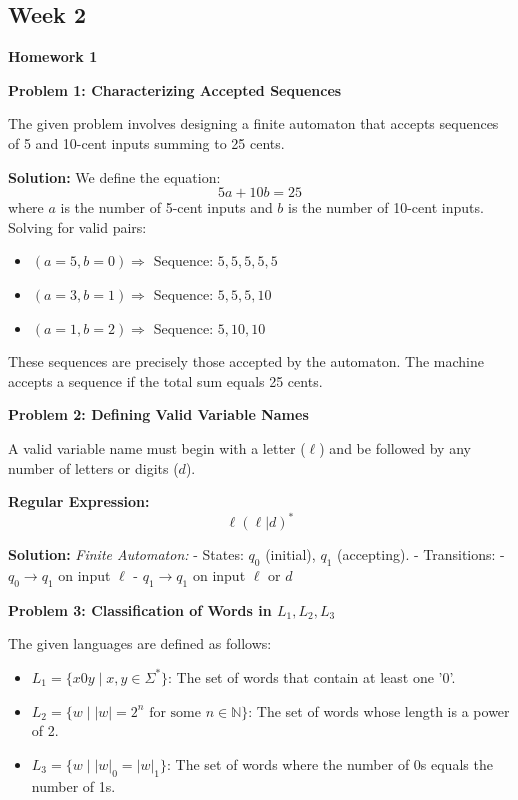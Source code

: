 \documentclass{article}
\theoremstyle{theorem}
\theoremstyle{definition}
\theoremstyle{remark}
\begin{document}
\subsection{Week 2}
{\textbf{{Homework 1}}}

\textbf{Problem 1: Characterizing Accepted Sequences}

The given problem involves designing a finite automaton that accepts sequences of 5 and 10-cent inputs summing to 25 cents.

\textbf{Solution:}
We define the equation:
\begin{equation}
5a + 10b = 25
\end{equation}
where $a$ is the number of 5-cent inputs and $b$ is the number of 10-cent inputs. Solving for valid pairs:
\begin{itemize}
    \item $(a=5, b=0) \Rightarrow$ Sequence: $5,5,5,5,5$
    \item $(a=3, b=1) \Rightarrow$ Sequence: $5,5,5,10$
    \item $(a=1, b=2) \Rightarrow$ Sequence: $5,10,10$
\end{itemize}
These sequences are precisely those accepted by the automaton. The machine accepts a sequence if the total sum equals 25 cents.\newline

\textbf{Problem 2: Defining Valid Variable Names}

A valid variable name must begin with a letter ($\ell$) and be followed by any number of letters or digits ($d$).

\textbf{Regular Expression:}
\begin{equation}
\ell(\ell | d)^*
\end{equation}

\textbf{Solution:}
\textit{Finite Automaton:}
- States: $q_0$ (initial), $q_1$ (accepting).
- Transitions:
  - $q_0 \to q_1$ on input $\ell$
  - $q_1 \to q_1$ on input $\ell$ or $d$

\textbf{Problem 3: Classification of Words in $L_1, L_2, L_3$}

The given languages are defined as follows:

\begin{itemize}
    \item $L_1 = \{ x0y \mid x, y \in \Sigma^* \}$: The set of words that contain at least one '0'.
    \item $L_2 = \{ w \mid |w| = 2^n \text{ for some } n \in \mathbb{N} \}$: The set of words whose length is a power of 2.
    \item $L_3 = \{ w \mid |w|_0 = |w|_1 \}$: The set of words where the number of 0s equals the number of 1s.
\end{itemize}
\end{document}

